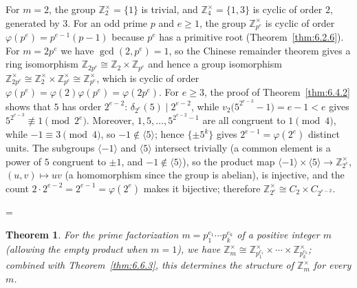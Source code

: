 \documentclass[11pt]{article}
\makeatletter
\theoremstyle{ntstyle}
\newtheorem{theorem}{Theorem}[subsection]
\let\nt@closedisplay\]
\def\nt@guardedclose{\@ifnextchar\par{\nt@closeafterpar}{\@ifnextchar\end{\postdisplaypenalty\@M\nt@closedisplay}{\nt@closedisplay}}}
\def\nt@closeafterpar\par{\@ifnextchar\par{\nt@closeafterpar}{\@ifnextchar\end{\postdisplaypenalty\@M\nt@closedisplay\par}{\nt@closedisplay\par}}}
\renewenvironment{proof}[1][\proofname]{\par
  \pushQED{\qed}\normalfont\topsep\medskipamount\edef\nt@afterproof{\@endparpenalty=\the\@endparpenalty\relax}\@beginparpenalty\@M\@endparpenalty\@M\let\]\nt@guardedclose\trivlist\item[]\textit{#1\@addpunct{.}} \ignorespaces}{\ifvmode\addpenalty\@M\fi\popQED\nt@afterproof\endtrivlist\@endpefalse}
\newcommand{\ZmodUnits}[1]{\mathbb{Z}_{#1}^{\times}}
\makeatother
\begin{document}
\begin{proof} For $m = 2$, the group $\ZmodUnits{2}
		= \{1\}$ is trivial, and $\ZmodUnits{4} = \{1, 3\}$ is cyclic of
	order $2$, generated by $3$. For an odd prime $p$ and $e \ge 1$, the
	group $\ZmodUnits{p^{e}}$ is cyclic of order $\varphi(p^{e}) =
		p^{e-1}(p-1)$ because $p^{e}$ has a primitive root (Theorem~\ref{thm:6.2.6}). For
	$m = 2p^{e}$ we have $\gcd(2, p^{e}) = 1$, so the Chinese remainder
	theorem gives a ring isomorphism $\mathbb{Z}_{2p^{e}} \cong \mathbb{Z}_2
		\times \mathbb{Z}_{p^{e}}$ and hence a group isomorphism
	$\ZmodUnits{2p^{e}} \cong \ZmodUnits{2} \times
		\ZmodUnits{p^{e}} \cong \ZmodUnits{p^{e}}$, which is
	cyclic of order $\varphi(p^{e}) = \varphi(2)\varphi(p^{e}) =
		\varphi(2p^{e})$. For $e \ge 3$, the proof of
	Theorem~\ref{thm:6.4.2} shows that $5$ has order $2^{e-2}$:
	$\delta_{2^e}(5) \mid 2^{e-2}$, while $v_2\big(5^{2^{e-3}} - 1\big) =
		e-1 < e$ gives $5^{2^{e-3}} \not\equiv 1 \pmod{2^e}$. Moreover, $1, 5,
		\ldots, 5^{2^{e-2}-1}$ are all congruent to $1 \pmod{4}$, while $-1 \equiv 3
		\pmod{4}$, so $-1 \notin \langle 5 \rangle$; hence $\{\pm 5^{k}\}$
	gives $2^{e-1} = \varphi(2^{e})$ distinct units. The subgroups
	$\langle-1\rangle$ and $\langle5\rangle$ intersect trivially (a common
	element is a power of $5$ congruent to $\pm1$, and
	$-1\notin\langle5\rangle$), so the product map
	$\langle-1\rangle\times\langle5\rangle\to\ZmodUnits{2^{e}}$,
	$(u,v)\mapsto uv$ (a homomorphism since the group is abelian), is
	injective, and the count $2\cdot2^{e-2}=2^{e-1}=\varphi(2^{e})$ makes
	it bijective; therefore
	$\ZmodUnits{2^{e}} \cong C_2 \times C_{2^{e-2}}$.

\end{proof}
\begin{theorem}\label{thm:6.6.4}
	For the prime factorization $m = p_1^{e_1} \cdots p_k^{e_k}$ of a positive integer $m$ (allowing the empty product when $m=1$), we have $\ZmodUnits{m} \cong
		\ZmodUnits{p_1^{e_1}} \times \cdots \times
		\ZmodUnits{p_k^{e_k}}$; combined with Theorem~\ref{thm:6.6.3}, this
	determines the structure of $\ZmodUnits{m}$ for every $m$.

\end{theorem}
\end{document}

